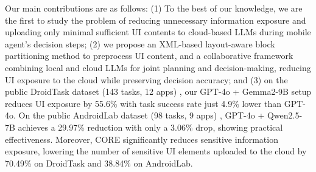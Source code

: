 Our main contributions are as follows: (1) To the best of our knowledge, we are the first to study the problem of reducing unnecessary information exposure and uploading only minimal sufficient UI contents to cloud-based LLMs during mobile agent's decision steps; (2) we propose an XML-based layout-aware block partitioning method to preprocess UI content, and a collaborative framework combining local and cloud LLMs for joint planning and decision-making, reducing UI exposure to the cloud while preserving decision accuracy; and (3) on the public DroidTask dataset (143 tasks, 12 apps) \citep{wen2024autodroid}, our GPT-4o + Gemma2-9B setup reduces UI exposure by 55.6\% with task success rate just 4.9\% lower than GPT-4o. On the public AndroidLab dataset (98 tasks, 9 apps) \citep{xu2024androidlab}, GPT-4o + Qwen2.5-7B achieves a 29.97\% reduction with only a 3.06\% drop, showing practical effectiveness. 
Moreover, CORE significantly reduces sensitive information exposure, lowering the number of sensitive UI elements uploaded to the cloud by 70.49\% on DroidTask and 38.84\% on AndroidLab.